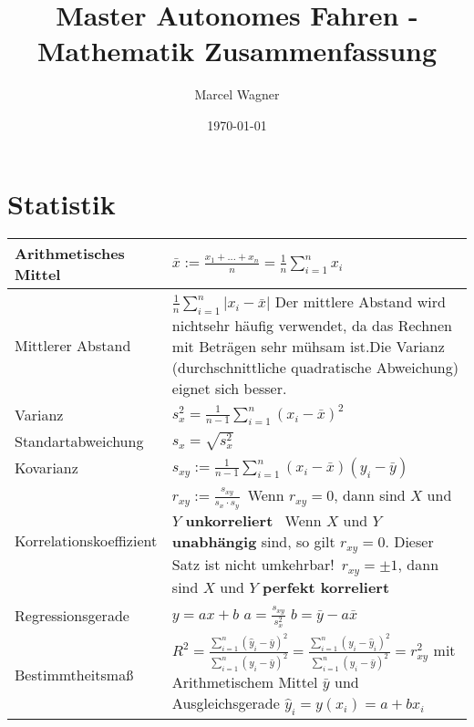 \documentclass[12pt]{article}
\title{Master Autonomes Fahren - Mathematik Zusammenfassung}
\author{Marcel Wagner}
\date{\today}
\begin{document}
\maketitle
{}
\setcounter{page}{1}
\section{Statistik}
\begin{table}[H]
	\centering
	\begin{tabular}{|l|p{}|}
		\hline
		Arithmetisches Mittel & \(\displaystyle \bar{x} := \frac{x_1 + ... + x_n}{n} = \frac{1}{n}\sum_{i=1}^{n}{x_i}\)\\\hline
		Mittlerer Abstand & \(\displaystyle \frac{1}{n}\sum_{i=1}^{n}{|x_i-\bar{x}|}\) \newline Der mittlere Abstand wird nichtsehr häufig verwendet, da das Rechnen mit Beträgen sehr mühsam ist.\newline Die Varianz (durchschnittliche quadratische Abweichung) eignet sich besser.\\\hline
		Varianz & \(\displaystyle s_x^2= \frac{1}{n-1}\sum_{i=1}^n{(x_i-\bar{x})^2}\)\\\hline
		Standartabweichung & \(\displaystyle s_x = \sqrt{s_x^2}\)\\\hline
		Kovarianz & \(\displaystyle s_{xy}:=\frac{1}{n-1}\sum_{i=1}^n(x_i-\bar{x})(y_i-\bar{y})\) \\\hline
		Korrelationskoeffizient & \(\displaystyle r_{xy}:=\frac{s_{xy}}{s_x\cdot s_y}\)\newline\textbullet~Wenn $r_{xy}=0$, dann sind $X$ und $Y$ \textbf{unkorreliert} \newline\textbullet~Wenn $X$ und $Y$ \textbf{unabhängig} sind, so gilt $r_{xy}=0$. Dieser Satz ist nicht umkehrbar!\newline\textbullet~$r_{xy}=\pm 1$, dann sind $X$ und $Y$ \textbf{perfekt korreliert}\\\hline
		Regressionsgerade & \(\displaystyle y=ax + b\) \newline \(\displaystyle a = \frac{s_{xy}}{s_x^2}\) \newline \(\displaystyle b = \bar{y} - a\bar{x}\)\\\hline
		Bestimmtheitsmaß & \(\displaystyle R^2 = \frac{\sum_{i=1}^n (\hat{y}_i-\bar{y})^2}{\sum_{i=1}^n (y_i-\bar{y})^2} = \frac{\sum_{i=1}^n (y_i - \hat{y}_i)^2}{\sum_{i=1}^n (y_i-\bar{y})^2}=r^2_{xy} \) \newline mit Arithmetischem Mittel $\bar{y}$ und Ausgleichsgerade $\hat{y}_i = y(x_i) = a+bx_i$\\\hline
	\end{tabular}
\end{table}
\end{document}
